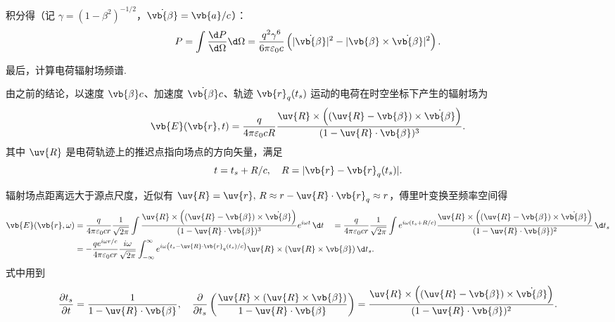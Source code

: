 积分得（记 \(\gamma = (1 - \beta^2)^{-1/2}\)，\(\dot{\vb{\beta}} = \vb{a}/c\)）：
\begin{equation*}
	P = \int \dfrac{\d P}{\d \Omega} \d \Omega = \dfrac{q^2 \gamma^6}{6\pi \varepsilon_0 c} \left( |\dot{\vb{\beta}}|^2 - |\vb{\beta} \times \dot{\vb{\beta}}|^2 \right).
\end{equation*}

最后，计算电荷辐射场频谱.

由之前的结论，以速度 \(\vb{\beta}c\)、加速度 \(\dot{\vb{\beta}}c\)、轨迹 \(\vb{r}_{q}(t_{s})\) 运动的电荷在时空坐标下产生的辐射场为
\begin{equation*}
	\vb{E}(\vb{r}, t) = \frac{q}{4\pi \varepsilon_{0} c R} \frac{\uv{R} \times \left( (\uv{R} - \vb{\beta}) \times \dot{\vb{\beta}} \right)}{(1 - \uv{R} \cdot \vb{\beta})^{3}}.
\end{equation*}
其中 \(\uv{R}\) 是电荷轨迹上的推迟点指向场点的方向矢量，满足
\begin{equation*}
	t = t_{s} + R/c, \quad R = |\vb{r} - \vb{r}_{q}(t_{s})|.
\end{equation*}

辐射场点距离远大于源点尺度，近似有 \(\uv{R}=\uv{r},\,R \approx r - \uv{R} \cdot \vb{r}_{q} \approx r\)，傅里叶变换至频率空间得
\begin{align*}
	\vb{E}(\vb{r}, \omega) &= \frac{q}{4\pi \varepsilon_{0} c r} \frac{1}{\sqrt{2\pi}} \int \frac{\uv{R} \times \left( (\uv{R} - \vb{\beta}) \times \dot{\vb{\beta}} \right)}{(1 - \uv{R} \cdot \vb{\beta})^{3}} e^{i\omega t} \, \d t \quad= \frac{q}{4\pi \varepsilon_{0} c r} \frac{1}{\sqrt{2\pi}} \int e^{i\omega (t_{s} + R/c)} \frac{\uv{R} \times \left( (\uv{R} - \vb{\beta}) \times \dot{\vb{\beta}} \right)}{(1 - \uv{R} \cdot \vb{\beta})^{2}} \, \d t_{s} \\
	&= -\frac{q e^{i\omega r/c}}{4\pi \varepsilon_{0} c r} \frac{i\omega}{\sqrt{2\pi}} \int_{-\infty}^{\infty} e^{i\omega \left( t_{s} - \uv{R} \cdot \vb{r}_{q}(t_{s})/c \right)} \uv{R} \times (\uv{R} \times \vb{\beta}) \, \d t_{s}.
\end{align*}
式中用到
\begin{equation*}
	\frac{\partial t_{s}}{\partial t} = \frac{1}{1 - \uv{R} \cdot \vb{\beta}}, \quad \frac{\partial}{\partial t_{s}} \left( \frac{\uv{R} \times (\uv{R} \times \vb{\beta})}{1 - \uv{R} \cdot \vb{\beta}} \right) = \frac{\uv{R} \times \left( (\uv{R} - \vb{\beta}) \times \dot{\vb{\beta}} \right)}{(1 - \uv{R} \cdot \vb{\beta})^{2}}.
\end{equation*}

